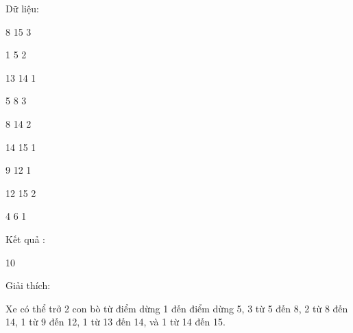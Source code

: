    Dữ liệu:  

   8 15 3   


   1 5 2   


   13 14 1   


   5 8 3   


   8 14 2   


   14 15 1   


   9 12 1   


   12 15 2   


   4 6 1  

   Kết quả :  

   10  

   Giải thích:  

   Xe có thể trở 2 con bò từ điểm dừng 1 đến điểm dừng 5, 3 từ 5 đến 8, 2 từ 8 đến 14, 1 từ 9 đến 12, 1 từ 13 đến 14, và 1 từ 14 đến 15.  

